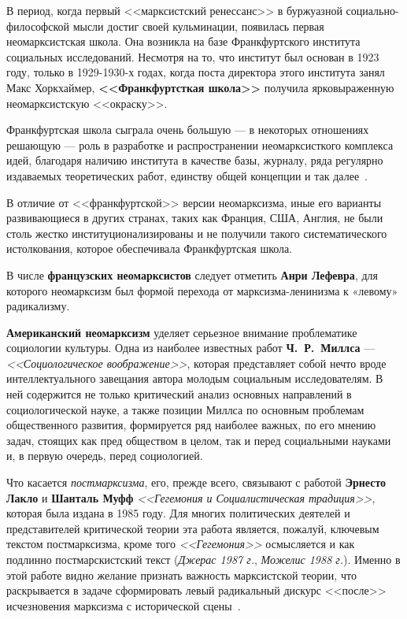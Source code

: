 В период, когда первый <<марксистский ренессанс>> в буржуазной социально-философской
мысли достиг своей кульминации, появилась первая неомарксистская школа. Она возникла
на базе Франкфуртского института социальных исследований. Несмотря на то, что
институт был основан в 1923 году, только в 1929-1930-х годах, когда поста директора
этого института занял Макс Хоркхаймер, \textbf{<<Франкфуртсткая школа>>}
получила ярковыраженную неомарксистскую <<окраску>>.

Франкфуртская школа сыграла очень большую --- в некоторых отношениях решающую ---
роль в разработке и распространении неомарксисткого комплекса идей, благодаря
наличию института в качестве базы, журналу, ряда регулярно издаваемых теоретических
работ, единству общей концепции и так далее~\cite{neomarxism}.

В отличие от <<франкфуртской>> версии неомарксизма, иные его варианты развивающиеся
в других странах, таких как Франция, США, Англия, не были столь жестко
институционализированы и не получили такого систематического истолкования,
которое обеспечивала Франкфуртская школа.

В числе \textbf{французских неомарксистов} следует отметить \textbf{Анри Лефевра},
для которого неомарксизм был формой перехода от марксизма-ленинизма
к «левому» радикализму.

\textbf{Американский неомарксизм} уделяет серьезное внимание проблематике социологии
культуры. Одна из наиболее известных работ \textbf{Ч.~Р.~Миллса} --- \textit{<<Социологическое воображение>>},
которая представляет собой нечто вроде интеллектуального завещания автора
молодым социальным исследователям. В ней содержится не только критический анализ основных
направлений в социологической науке, а также позиции Миллса по основным проблемам
общественного развития, формируется ряд наиболее важных, по его мнению задач,
стоящих как пред обществом в целом, так и перед социальными науками и, в первую очередь,
перед социологией.

Что касается \textit{постмарксизма}, его, прежде  всего, связывают с
работой \textbf{Эрнесто Лакло} и \textbf{Шанталь Муфф}
\textit{<<Гегемония и Социалистическая традиция>>},
которая была издана в 1985 году. Для многих политических деятелей и
представителей критической теории эта работа является, пожалуй, ключевым
текстом постмарксизма, кроме того \textit{<<Гегемония>>} осмысляется и как подлинно
постмарскистский текст (\textit{Джерас 1987 г.}, \textit{Можелис 1988 г.}).
Именно в этой работе видно желание признать важность марксистской теории, что раскрывается
в задаче сформировать левый радикальный дискурс <<после>> исчезновения
марксизма с исторической сцены~\cite{key_thinkers}.
